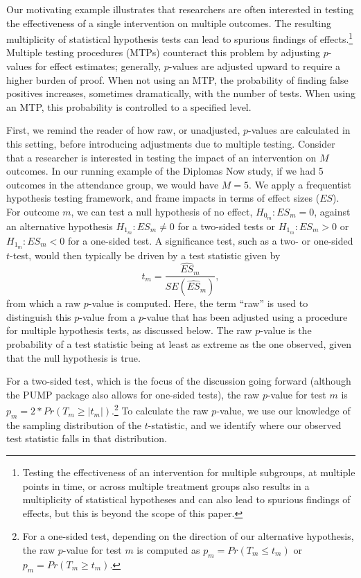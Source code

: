 \documentclass[
]{article}
\begin{document}
Our motivating example illustrates that researchers are often interested
in testing the effectiveness of a single intervention on multiple
outcomes. The resulting multiplicity of statistical hypothesis tests can
lead to spurious findings of
effects.\footnote{Testing the effectiveness of an intervention for multiple subgroups, at multiple points in time, or across multiple treatment groups also results in a multiplicity of statistical hypotheses and can also lead to spurious findings of effects, but this is beyond the scope of this paper.}
Multiple testing procedures (MTPs) counteract this problem by adjusting
\(p\)-values for effect estimates; generally, \(p\)-values are adjusted
upward to require a higher burden of proof. When not using an MTP, the
probability of finding false positives increases, sometimes
dramatically, with the number of tests. When using an MTP, this
probability is controlled to a specified level.

First, we remind the reader of how raw, or unadjusted, \(p\)-values are
calculated in this setting, before introducing adjustments due to
multiple testing. Consider that a researcher is interested in testing
the impact of an intervention on \(M\) outcomes. In our running example
of the Diplomas Now study, if we had 5 outcomes in the attendance group,
we would have \(M = 5\). We apply a frequentist hypothesis testing
framework, and frame impacts in terms of effect sizes (\(ES\)). For
outcome \(m\), we can test a null hypothesis of no effect,
\(H_{0_m}: ES_m = 0\), against an alternative hypothesis
\(H_{1_m}: ES_m \neq 0\) for a two-sided tests or \(H_{1_m}: ES_m > 0\)
or \(H_{1_m}: ES_m < 0\) for a one-sided test. A significance test, such
as a two- or one-sided \(t\)-test, would then typically be driven by a
test statistic given by \begin{equation}
t_m = \frac{\hat{ES}_m}{SE(\hat{ES}_m)},
\end{equation} from which a raw \(p\)-value is computed. Here, the term
``raw'' is used to distinguish this \(p\)-value from a \(p\)-value that
has been adjusted using a procedure for multiple hypothesis tests, as
discussed below. The raw \(p\)-value is the probability of a test
statistic being at least as extreme as the one observed, given that the
null hypothesis is true.

For a two-sided test, which is the focus of the discussion going forward
(although the PUMP package also allows for one-sided tests), the raw
\(p\)-value for test \(m\) is
\(p_m=2*Pr(T_m \geq |t_m|)\).\footnote{For a one-sided test, depending on the direction of our alternative hypothesis, the raw $p$-value for test $m$ is computed as $p_m=Pr(T_m \leq t_m)$ or $p_m=Pr(T_m \geq t_m)$.}
To calculate the raw \(p\)-value, we use our knowledge of the sampling
distribution of the \(t\)-statistic, and we identify where our observed
test statistic falls in that distribution.
\end{document}
